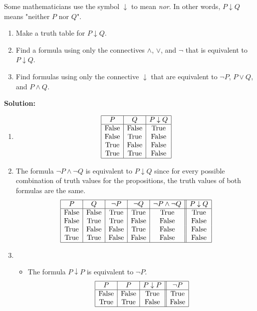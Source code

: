Some mathematicians use the symbol $\downarrow$ to mean \textit{nor}. In other words, $P \downarrow Q$ means "neither $P$ nor $Q$".
\begin{enumerate}[label=(\alph*)]
    \item Make a truth table for $P \downarrow Q$.
    \item Find a formula using only the connectives $\wedge$, $\vee$, and $\neg$ that is equivalent to $P \downarrow Q$.
    \item Find formulas using only the connective $\downarrow$ that are equivalent to $\neg P$, $P \vee Q$, and $P \wedge Q$.
\end{enumerate}

\textbf{Solution:}
\begin{enumerate}[label=(\alph*)]
\item 
    \[
    \begin{array}{|c|c|c|}
    \hline
    P & Q & P \downarrow Q \\
    \hline
    \text{False} & \text{False} & \text{True} \\
    \text{False} & \text{True} & \text{False} \\
    \text{True} & \text{False} & \text{False} \\
    \text{True} & \text{True} & \text{False} \\
    \hline
    \end{array}
    \]

\item The formula $\neg P \wedge \neg Q$ is equivalent to $P \downarrow Q$ since for every possible combination of truth values for the propositions, the truth values of both formulas are the same. 
\[
\begin{array}{|c|c|c|c|c||c|}
\hline
P & Q & \neg P & \neg Q & \neg P \wedge \neg Q & P \downarrow Q \\
\hline
\text{False} & \text{False} & \text{True} & \text{True} & \text{True} & \text{True} \\
\text{False} & \text{True} & \text{True} & \text{False} & \text{False} & \text{False} \\
\text{True} & \text{False} & \text{False} & \text{True} & \text{False} & \text{False} \\
\text{True} & \text{True} & \text{False} & \text{False} & \text{False} & \text{False} \\
\hline
\end{array}
\]

\pagebreak

\item \begin{itemize}
    \item The formula $P \downarrow P$ is equivalent to $\neg P$.
    \[
    \begin{array}{|c|c|c||c|}
    \hline
    P & P & P \downarrow P & \neg P \\
    \hline
    \text{False} & \text{False} & \text{True} & \text{True}\\
    \text{True} & \text{True} & \text{False} & \text{False} \\
    \hline
    \end{array}
    \]


\end{itemize}
\end{enumerate}
